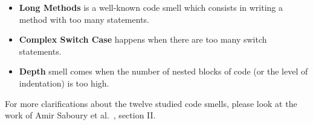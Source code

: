 {\begin{itemize}
	\item \textbf{Long Methods} is a well-known code smell \cite{marinescu2006object, fard2013jsnose, fontana2012automatic} which consists in writing a method with too many statements.
	\item \textbf{Complex Switch Case} happens when there are too many switch statements.
	\item \textbf{Depth} smell comes when the number of nested blocks of code (or the level of indentation) is too high.
\end{itemize}
For more clarifications about the twelve studied code smells, please look at the work of Amir Saboury et al.~\cite{saboury2017empirical}, section II.
}